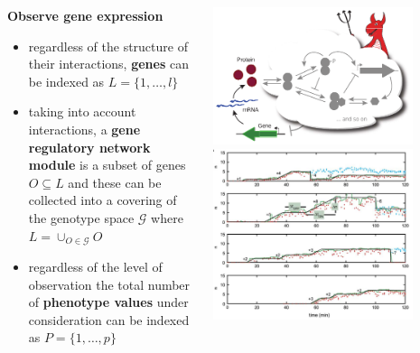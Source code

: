 \begin{frame}
\begin{columns}[c]
\begin{column}{0.5\textwidth}
\begin{block}{\textbf{Observe gene expression}}
\begin{small}
\begin{itemize}
\item regardless of the structure of their interactions, \textbf{genes} can be indexed as $L = \{1, \ldots, l \}$
\item taking into account interactions, a \textbf{gene regulatory network module} is a subset of genes $O \subseteq L$ and these can be collected into a covering of the genotype space $\mathcal{G}$ where $L = \cup_{O \in \mathcal{G}} O$
\item regardless of the level of observation the total number of \textbf{phenotype values} under consideration can be indexed as $P = \{ 1, \ldots, p \} $
\end{itemize}
\end{small}
\end{block}
\end{column}
\begin{column}{0.5\textwidth}
\begin{center}
\includegraphics[width=0.8\textwidth]{fig/geneexpressiondemon.pdf}
\cite{Lestas2010}
\includegraphics[width=0.8\textwidth]{fig/transcriptcounts.png}

\end{center}
\end{column}
\end{columns}
\end{frame}
